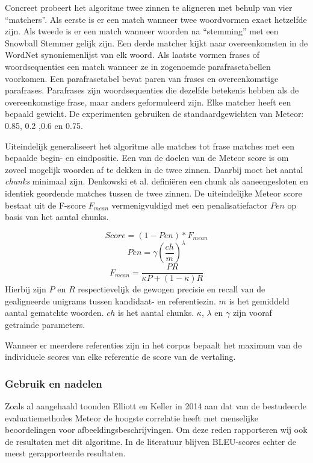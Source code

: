 Concreet probeert het algoritme twee zinnen te aligneren met behulp van vier ``matchers''. Als eerste is er een match wanneer twee woordvormen exact hetzelfde zijn. Als tweede is er een match wanneer woorden na ``stemming'' met een Snowball Stemmer\cite{porter2001snowball} gelijk zijn. Een derde matcher kijkt naar overeenkomsten in de WordNet synoniemenlijst van elk woord\cite{Miller1990}. Als laatste vormen frases of woordsequenties een match wanneer ze in zogenoemde parafrasetabellen voorkomen. Een parafrasetabel bevat paren van frases en overeenkomstige parafrases. Parafrases zijn woordsequenties die dezelfde betekenis hebben als de overeenkomstige frase, maar anders geformuleerd zijn.
Elke matcher heeft een bepaald gewicht. De experimenten gebruiken de standaardgewichten van Meteor: 0.85, 0.2 ,0.6 en 0.75.

Uiteindelijk generaliseert het algoritme alle matches tot frase matches met een bepaalde begin- en eindpositie. Een van de doelen van de Meteor score is om zoveel mogelijk woorden af te dekken in de twee zinnen. Daarbij moet het aantal \textit{chunks} minimaal zijn. Denkowski et al. defini\"eren een chunk als aaneengesloten en identiek geordende matches tussen de twee zinnen\cite{Denkowski2007a}. De uiteindelijke Meteor score bestaat uit de F-score $F_{mean}$ vermenigvuldigd met een penalisatiefactor $Pen$ op basis van het aantal chunks.


\begin{equation}
Score = (1 - Pen)*F_{mean}
\end{equation} 
\begin{equation}
Pen = \gamma (\frac{ch}{m})^\lambda 
\end{equation}
\begin{equation}
F_{mean} = \frac{PR}{\kappa P + (1- \kappa)R}
\end{equation}
Hierbij zijn $P$ en $R$ respectievelijk de gewogen precisie en recall van de gealigneerde unigrams tussen kandidaat- en referentiezin. $m$ is het gemiddeld aantal gematchte woorden. $ch$ is het aantal chunks. $\kappa$, $\lambda$ en $\gamma$ zijn vooraf getrainde parameters.

Wanneer er meerdere referenties zijn in het corpus bepaalt het maximum van de individuele scores van elke referentie de score van de vertaling.

\subsubsection{Gebruik en nadelen}
Zoals al aangehaald toonden Elliott en Keller in 2014 aan dat van de bestudeerde evaluatiemethodes Meteor de hoogste correlatie heeft met menselijke beoordelingen voor afbeeldingsbeschrijvingen. Om deze reden rapporteren wij ook de resultaten met dit algoritme. In de literatuur blijven BLEU-scores echter de meest gerapporteerde resultaten.

